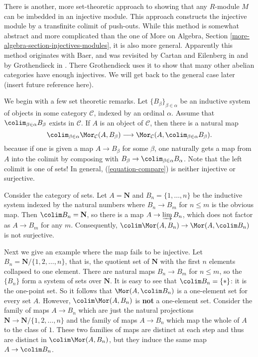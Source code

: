 \noindent
There is another, more set-theoretic approach to showing that any $R$-module
$M$ can be imbedded in an injective module. This approach constructs
the injective module by a transfinite colimit of push-outs. While this
method is somewhat abstract and more complicated than the one of
More on Algebra, Section \ref{more-algebra-section-injectives-modules},
it is also more general. Apparently this method originates with Baer,
and was revisited by Cartan and Eilenberg in
\cite{Cartan-Eilenberg} and by Grothendieck in \cite{Tohoku}.
There Grothendieck uses it to show that
many other abelian categories have enough injectives. We will get back to
the general case later (insert future reference here).

\medskip\noindent
We begin with a few set theoretic remarks.
Let $\{B_{\beta}\}_{\beta \in \alpha}$ be an inductive system of
objects in some category $\mathcal{C}$, indexed by
an ordinal $\alpha$. Assume that $\colim_{\beta \in \alpha} B_\beta$
exists in $\mathcal{C}$. If $A$ is an object of $\mathcal{C}$, then there is a
natural map
\begin{equation}
\label{equation-compare}
\colim_{\beta \in \alpha} \Mor_\mathcal{C}(A, B_\beta)
\longrightarrow
\Mor_\mathcal{C}(A, \colim_{\beta \in \alpha} B_\beta).
\end{equation}
because if one is given a map $A \to B_\beta$ for some $\beta$, one
naturally gets a map from $A$  into the colimit by composing with
$B_\beta \to \colim_{\beta \in \alpha} B_\alpha$.
Note that the left colimit is one of sets! In general, (\ref{equation-compare})
is neither injective or surjective.

\begin{example}
\label{example-not-surjective}
Consider the category of sets. Let $A = \mathbf{N}$ and
$B_n = \{1, \dots, n\}$ be the inductive system indexed by the natural numbers
where $B_n \to B_m$ for $n \leq m$ is the obvious map. Then
$\colim B_n = \mathbf{N}$, so there is a map
$A \to \varinjlim B_n$, which does not factor as $A \to B_m$
for any $m$. Consequently,
$\colim \Mor(A, B_n) \to \Mor(A, \colim B_n)$
is not surjective.
\end{example}

\begin{example}
\label{example-not-injective}
Next we give an example where the map fails to be injective. Let $B_n =
\mathbf{N}/\{1,  2, \dots, n\}$, that is, the quotient set of
$\mathbf{N}$ with the first $n$ elements collapsed to one element.
There are natural maps $B_n \to B_m$ for $n \leq m$, so the
$\{B_n\}$ form a system of sets over $\mathbf{N}$. It is easy to see that
$\colim B_n = \{*\}$: it is the one-point set.
So it follows that $\Mor(A, \colim B_n)$ is a one-element set
for every set $A$.
However, $\colim \Mor(A , B_n)$ is {\bf not} a one-element set.
Consider the family of maps $A \to B_n$ which are just the natural projections
$\mathbf{N} \to \mathbf{N}/\{1, 2, \dots, n\}$ and the family of
maps $A \to B_n$ which map the whole of $A$ to the class of $1$.
These two families of maps are distinct at each step and thus are distinct in
$\colim \Mor(A, B_n)$, but they induce the same map
$A \to \colim B_n$.
\end{example}

